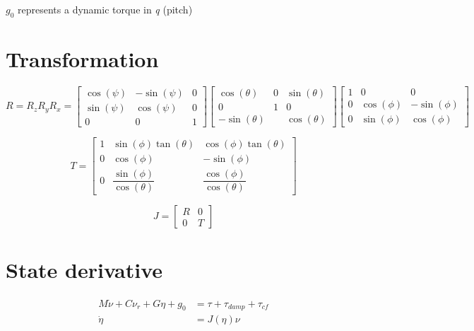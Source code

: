 \documentclass[12pt,a4]{article}
\begin{document}
$g_0$ represents a dynamic torque in \textit{q} (pitch)

\section{Transformation}
\begin{equation}
	R = R_z R_y R_x =
	\begin{bmatrix}
		\cos(\psi) & -\sin(\psi) & 0 \\
		\sin(\psi) & \cos(\psi)  & 0 \\
		0          & 0           & 1
	\end{bmatrix}
	\begin{bmatrix}
		\cos(\theta)  & 0 & \sin(\theta) \\
		0             & 1 & 0            \\
		-\sin(\theta) &   & \cos(\theta)
	\end{bmatrix}
	\begin{bmatrix}
		1 & 0          & 0           \\
		0 & \cos(\phi) & -\sin(\phi) \\
		0 & \sin(\phi) & \cos(\phi)
	\end{bmatrix}
\end{equation}

\begin{equation}
	T =
	\begin{bmatrix}
		1 & \sin(\phi)\tan(\theta)           & \cos(\phi)\tan(\theta)           \\
		0 & \cos(\phi)                       & -\sin(\phi)                      \\
		0 & \dfrac{\sin(\phi)}{\cos(\theta)} & \dfrac{\cos(\phi)}{\cos(\theta)}
	\end{bmatrix}
\end{equation}

\begin{equation}
	J = \begin{bmatrix}
		R & 0 \\
		0 & T
	\end{bmatrix}
\end{equation}

\section{State derivative}
\begin{align}
	M \dot{\nu} + C \nu_r + G \eta + g_0 & = \tau + \tau_{damp} + \tau_{cf} \\
	\dot{\eta}                           & = J(\eta)\nu
\end{align}
\end{document}
